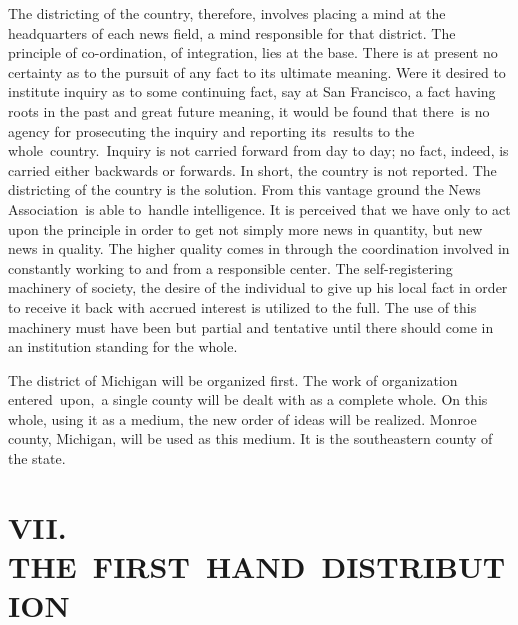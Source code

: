 \documentclass[openany,nobib]{tufte-book}
\begin{document}
The districting of the country, therefore, involves placing a mind at
the headquarters of each news field, a mind responsible for that
district. The principle of co-ordination, of integration, lies at the
base. There is at present no certainty as to the pursuit of any fact to
its ultimate meaning. Were it desired to institute inquiry as to some
continuing fact, say at San Francisco, a fact having roots in the past
and great future meaning, it would be found that there~is no agency for
prosecuting the inquiry and reporting its~results to the
whole~country.~Inquiry is not carried forward from day to day; no fact,
indeed, is carried either backwards or forwards. In short, the country
is not reported. The districting of the country is the solution. From
this vantage ground the News Association~is able to~handle intelligence.
It is perceived that we have only to act upon the principle in order to
get not simply more news in quantity, but new news in quality. The
higher quality comes in through the coordination involved in constantly
working to and from a responsible center. The self-registering machinery
of society, the desire of the individual to give up his local fact in
order to receive it back with accrued interest is utilized to the full.
The use of this machinery must have been but partial and tentative until
there should come in an institution standing for the whole.~

The district of Michigan will be organized first. The work of
organization entered~upon,~a single county will be dealt with as a
complete whole. On this whole, using it as a medium, the new order of
ideas will be realized. Monroe county, Michigan, will be used as this
medium. It is the southeastern county of the state.~



\hypertarget{vii-the-first-hand-distribution}{%
\section{VII.
THE~FIRST~HAND~DISTRIBUTION}\label{vii-the-first-hand-distribution}}
\end{document}
